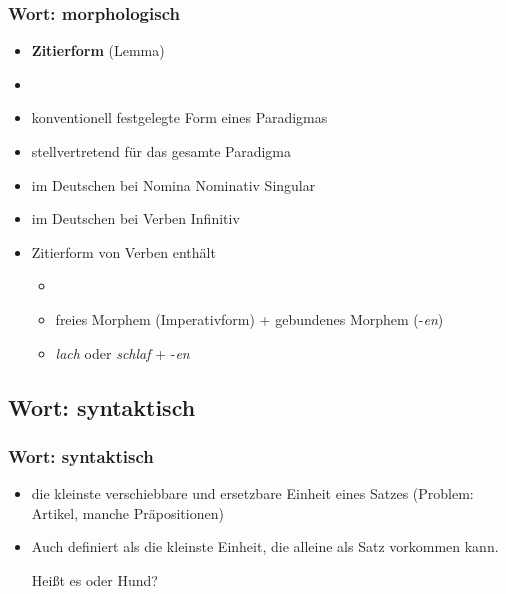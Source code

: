 \begin{frame}
\frametitle{Wort: morphologisch}

\begin{itemize}
	\item \textbf{Zitierform} (Lemma)
	\item[]
	\item konventionell festgelegte Form eines Paradigmas
	\item stellvertretend für das gesamte Paradigma
	\item im Deutschen bei Nomina \ras Nominativ Singular
	\item im Deutschen bei Verben \ras Infinitiv
	\item Zitierform von Verben enthält
	
	\begin{itemize}
		\item[]
		\item freies Morphem (Imperativform) + gebundenes Morphem (-\emph{en})
		\item \emph{lach} oder \emph{schlaf} + -\emph{en}
	\end{itemize}
\end{itemize}


\end{frame}


\subsection{Wort: syntaktisch}


\begin{frame}
\frametitle{Wort: syntaktisch}

\begin{itemize}
	\item die kleinste verschiebbare und ersetzbare Einheit eines Satzes
(Problem: Artikel, manche Präpositionen)
	
	  \eal
          \zl

	\item Auch definiert als die kleinste Einheit, die alleine als Satz
vorkommen kann.

\eal
\ex Heißt es  oder  Hund?
\ex {}
\zl
		 
\end{itemize}


\end{frame}


